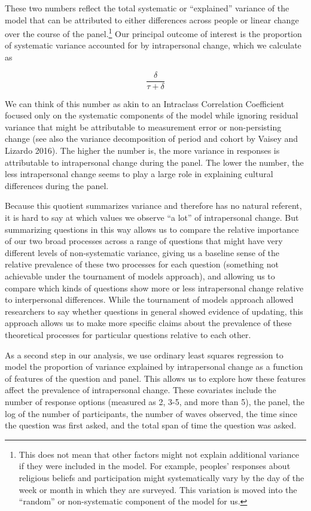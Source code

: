 \documentclass[
  11pt,
]{article}
\begin{document}
These two numbers reflect the total systematic or ``explained'' variance
of the model that can be attributed to either differences across people
or linear change over the course of the panel.\footnote{This does not
  mean that other factors might not explain additional variance if they
  were included in the model. For example, peoples' responses about
  religious beliefs and participation might systematically vary by the
  day of the week or month in which they are surveyed. This variation is
  moved into the ``random'' or non-systematic component of the model for
  us.} Our principal outcome of interest is the proportion of systematic
variance accounted for by intrapersonal change, which we calculate as

\[
\frac{\delta}{\tau + \delta}
\]

We can think of this number as akin to an Intraclass Correlation
Coefficient focused only on the systematic components of the model while
ignoring residual variance that might be attributable to measurement
error or non-persisting change (see also the variance decomposition of
period and cohort by Vaisey and Lizardo 2016). The higher the number is,
the more variance in responses is attributable to intrapersonal change
during the panel. The lower the number, the less intrapersonal change
seems to play a large role in explaining cultural differences during the
panel.

Because this quotient summarizes variance and therefore has no natural
referent, it is hard to say at which values we observe ``a lot'' of
intrapersonal change. But summarizing questions in this way allows us to
compare the relative importance of our two broad processes across a
range of questions that might have very different levels of
non-systematic variance, giving us a baseline sense of the relative
prevalence of these two processes for each question (something not
achievable under the tournament of models approach), and allowing us to
compare which kinds of questions show more or less intrapersonal change
relative to interpersonal differences. While the tournament of models
approach allowed researchers to say whether questions in general showed
evidence of updating, this approach allows us to make more specific
claims about the prevalence of these theoretical processes for
particular questions relative to each other.

As a second step in our analysis, we use ordinary least squares
regression to model the proportion of variance explained by
intrapersonal change as a function of features of the question and
panel. This allows us to explore how these features affect the
prevalence of intrapersonal change. These covariates include the number
of response options (measured as 2, 3-5, and more than 5), the panel,
the log of the number of participants, the number of waves observed, the
time since the question was first asked, and the total span of time the
question was asked.
\end{document}
